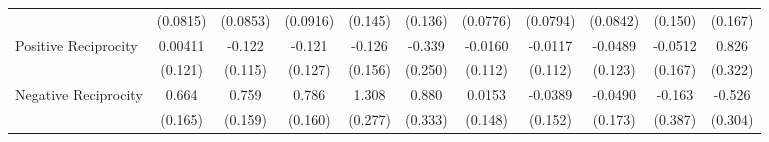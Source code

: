 {\begin{tabular}{l*{10}{c}}
            &    (0.0815)         &    (0.0853)         &    (0.0916)         &     (0.145)         &     (0.136)         &    (0.0776)         &    (0.0794)         &    (0.0842)         &     (0.150)         &     (0.167)         \\
\addlinespace
Positive Reciprocity&     0.00411         &      -0.122         &      -0.121         &      -0.126         &      -0.339         &     -0.0160         &     -0.0117         &     -0.0489         &     -0.0512         &       0.826\sym{*}  \\
            &     (0.121)         &     (0.115)         &     (0.127)         &     (0.156)         &     (0.250)         &     (0.112)         &     (0.112)         &     (0.123)         &     (0.167)         &     (0.322)         \\
\addlinespace
Negative Reciprocity&       0.664\sym{***}&       0.759\sym{***}&       0.786\sym{***}&       1.308\sym{***}&       0.880\sym{**} &      0.0153         &     -0.0389         &     -0.0490         &      -0.163         &      -0.526         \\
            &     (0.165)         &     (0.159)         &     (0.160)         &     (0.277)         &     (0.333)         &     (0.148)         &     (0.152)         &     (0.173)         &     (0.387)         &     (0.304)         \\
\bottomrule
\end{tabular}
}
